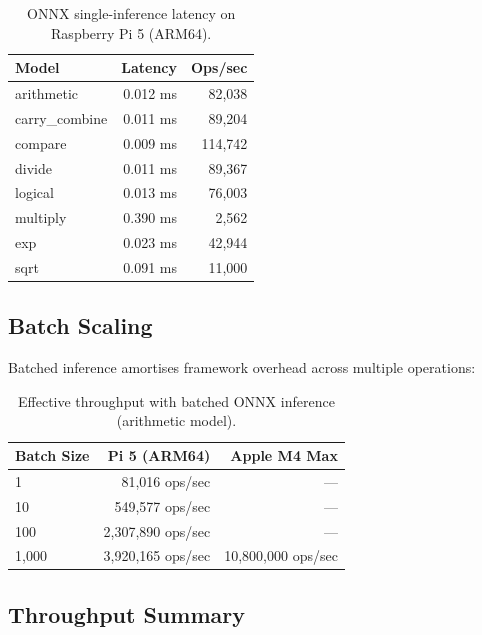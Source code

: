 \documentclass[11pt,a4paper]{article}
\begin{document}
\begin{table}[h]
\centering
\begin{tabular}{lrr}
\toprule
\textbf{Model} & \textbf{Latency} & \textbf{Ops/sec} \\
\midrule
arithmetic & 0.012 ms & 82,038 \\
carry\_combine & 0.011 ms & 89,204 \\
compare & 0.009 ms & 114,742 \\
divide & 0.011 ms & 89,367 \\
logical & 0.013 ms & 76,003 \\
multiply & 0.390 ms & 2,562 \\
exp & 0.023 ms & 42,944 \\
sqrt & 0.091 ms & 11,000 \\
\bottomrule
\end{tabular}
\caption{ONNX single-inference latency on Raspberry Pi 5 (ARM64).}
\end{table}

\subsection{Batch Scaling}

Batched inference amortises framework overhead across multiple operations:

\begin{table}[h]
\centering
\begin{tabular}{lrr}
\toprule
\textbf{Batch Size} & \textbf{Pi 5 (ARM64)} & \textbf{Apple M4 Max} \\
\midrule
1 & 81,016 ops/sec & --- \\
10 & 549,577 ops/sec & --- \\
100 & 2,307,890 ops/sec & --- \\
1,000 & 3,920,165 ops/sec & 10,800,000 ops/sec \\
\bottomrule
\end{tabular}
\caption{Effective throughput with batched ONNX inference (arithmetic model).}
\end{table}

\subsection{Throughput Summary}
\end{document}
